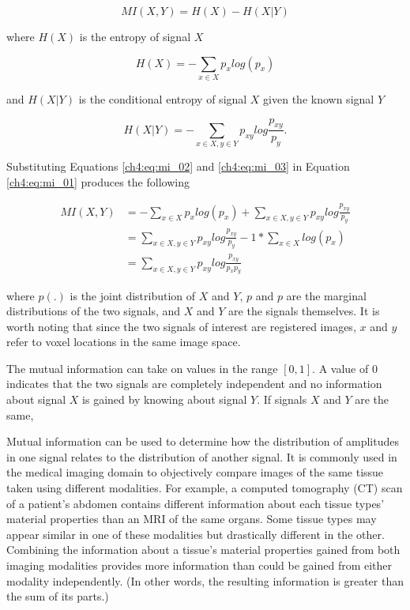 \begin{equation}
\label{ch4:eq:mi_01}
MI(X, Y) = H(X) - H(X|Y)
\end{equation}

\noindent where $H(X)$ is the entropy of signal $X$

\begin{equation}
\label{ch4:eq:mi_02}
H(X) = - \sum_{x \in X} p_x log(p_x) 
\end{equation}

and $H(X|Y)$ is the conditional entropy of signal $X$ given the known signal $Y$

\begin{equation}
\label{ch4:eq:mi_03}
H(X|Y) = - \sum_{x \in X, y \in Y} p_{xy} log \frac{p_{xy}}{p_y}.
\end{equation}

Substituting Equations \ref{ch4:eq:mi_02} and \ref{ch4:eq:mi_03} in Equation \ref{ch4:eq:mi_01} produces the following

\begin{equation}
\label{ch4:eq:mi_04}
\begin{split}
MI(X, Y) & = - \sum_{x \in X} p_x log(p_x) + \sum_{x \in X, y \in Y} p_{xy} log \frac{p_{xy}}{p_y} \\
 & = \sum_{x \in X, y \in Y} p_{xy} log \frac{p_{xy}}{p_y} - 1*\sum_{x \in X} log(p_x) \\
 & = \sum_{x \in X, y \in Y} p_{xy} log \frac{p_{xy}}{p_x p_y}
\end{split}
\end{equation}

\noindent where $p(.)$ is the joint distribution of $X$ and $Y$, $p$ and $p$ are the marginal distributions of the two signals, and $X$ and $Y$ are the signals themselves. It is worth noting that since the two signals of interest are registered images, $x$ and $y$ refer to voxel locations in the same image space.

The mutual information can take on values in the range $[0, 1]$. A value of $0$ indicates that the two signals are completely independent and no information about signal $X$ is gained by knowing about signal $Y$. If signals $X$ and $Y$ are the same, 

Mutual information can be used to determine how the distribution of amplitudes in one signal relates to the distribution of another signal. It is commonly used in the medical imaging domain to objectively compare images of the same tissue taken using different modalities. For example, a computed tomography (CT) scan of a patient's abdomen contains different information about each tissue types' material properties than an MRI of the same organs. Some tissue types may appear similar in one of these modalities but drastically different in the other. Combining the information about a tissue's material properties gained from both imaging modalities provides more information than could be gained from either modality independently. (In other words, the resulting information is greater than the sum of its parts.)

